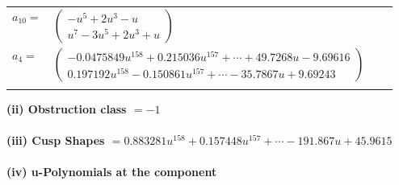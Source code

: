 \documentclass[1p]{elsarticle_modified}
\theoremstyle{definition}
\begin{document}
\begin{tabular}{m{7pt} m{180pt} m{7pt} m{180pt} }
\flushright $a_{10}=$&$\begin{pmatrix}- u^5+2 u^3- u\\u^7-3 u^5+2 u^3+u\end{pmatrix}$ \\
\flushright $a_{4}=$&$\begin{pmatrix}-0.0475849 u^{158}+0.215036 u^{157}+\cdots+49.7268 u-9.69616\\0.197192 u^{158}-0.150861 u^{157}+\cdots-35.7867 u+9.69243\end{pmatrix}$\\&\end{tabular}
\flushleft \textbf{(ii) Obstruction class $= -1$}\\~\\
\flushleft \textbf{(iii) Cusp Shapes $= 0.883281 u^{158}+0.157448 u^{157}+\cdots-191.867 u+45.9615$}\\~\\
\newpage\renewcommand{\arraystretch}{1}
\flushleft \textbf{(iv) u-Polynomials at the component}\newline \\
\end{document}
